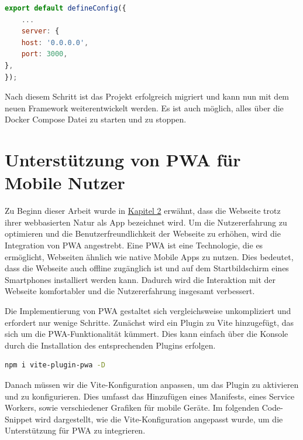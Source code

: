 \begin{lstlisting}[language={JavaScript}, caption={Port Konfiguration für das Vue Projekt}]
export default defineConfig({
    ...
    server: {
    host: '0.0.0.0',
    port: 3000,
},
});
\end{lstlisting}

Nach diesem Schritt ist das Projekt erfolgreich migriert und kann nun mit dem neuen Framework weiterentwickelt werden. Es ist auch möglich, alles über die Docker Compose Datei zu starten und zu stoppen.

\section{Unterstützung von PWA für Mobile Nutzer}

Zu Beginn dieser Arbeit wurde in \hyperref[chapter:2]{Kapitel 2} erwähnt, dass die Webseite trotz ihrer webbasierten Natur als App bezeichnet wird.
Um die Nutzererfahrung zu optimieren und die Benutzerfreundlichkeit der Webseite zu erhöhen, wird die Integration von \acf{PWA} angestrebt.
Eine \acs{PWA} ist eine Technologie, die es ermöglicht, Webseiten ähnlich wie native Mobile Apps zu nutzen.
Dies bedeutet, dass die Webseite auch offline zugänglich ist und auf dem Startbildschirm eines Smartphones installiert werden kann.
Dadurch wird die Interaktion mit der Webseite komfortabler und die Nutzererfahrung insgesamt verbessert. \cite{ms-pwa}

Die Implementierung von \acs{PWA} gestaltet sich vergleichsweise unkompliziert und erfordert nur wenige Schritte. Zunächst wird ein Plugin zu Vite hinzugefügt, das sich um die \acs{PWA}-Funktionalität kümmert. Dies kann einfach über die Konsole durch die Installation des entsprechenden Plugins erfolgen.

\begin{lstlisting}[language={bash}, caption={Installation des PWA Plugins}]
npm i vite-plugin-pwa -D 
\end{lstlisting}

Danach müssen wir die Vite-Konfiguration anpassen, um das Plugin zu aktivieren und zu konfigurieren.
Dies umfasst das Hinzufügen eines Manifests, eines Service Workers, sowie verschiedener Grafiken für mobile Geräte.
Im folgenden Code-Snippet wird dargestellt, wie die Vite-Konfiguration angepasst wurde, um die Unterstützung für \acs{PWA} zu integrieren.

